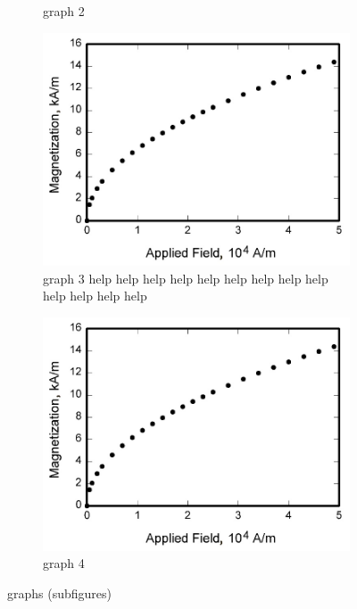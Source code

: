 \begin{figure}[H]
\begin{subfigure}[t]{0.48\textwidth}
        \caption{graph 2}
        \label{subfig:graph2}
    \end{subfigure}
    \bigskip
    \begin{subfigure}[t]{0.48\textwidth}
        \centering
        \includegraphics[width=1.0\textwidth]{Images/graph.jpg}
        \caption{graph 3 help help help help help help help help help help help help help}
        \label{subfig:graph3}
    \end{subfigure}
    \hfill
    \begin{subfigure}[t]{0.48\textwidth}
        \centering
        \includegraphics[width=1.0\textwidth]{Images/graph.jpg}
        \caption{graph 4}
        \label{subfig:graph4}
    \end{subfigure}
    \caption{graphs (subfigures)}
    \label{fig:graph_subfigures}
\end{figure}

